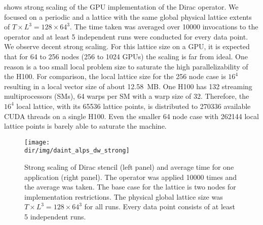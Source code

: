  shows strong scaling of the GPU implementation of the Dirac operator.
We focused on a periodic and a \Cstar lattice with the same global physical lattice extents of $T \times L^{3} = 128 \times 64^{3}$.
The time taken was averaged over \num{10000} invocations to the operator and at least \num{5} independent runs were conducted for every data point.
We observe decent strong scaling.
For this lattice size on a GPU, it is expected that for \num{64} to \num{256} nodes (\num{256} to \num{1024} GPUs) the scaling is far from ideal.
One reason is a too small local problem size to saturate the high parallelizability of the H100.
For comparison, the local lattice size for the \num{256} node case is $16^{4}$ resulting in a local vector size of about \SI{12.58}{MB}.
One H100 has \num{132} streaming multiprocessors (SMs), \num{64} warps per SM with a warp size of \num{32}.
Therefore, the $16^{4}$ local lattice, with its \num{65536} lattice points, is distributed to \num{270336} available CUDA threads on a single H100.
Even the smaller \num{64} node case with \num{262144} local lattice points is barely able to saturate the machine.
\begin{figure}
    \centering
    \texttt{[image: \\dir/img/daint\_alps\_dw\_strong]}
    \caption{Strong scaling of Dirac stencil (left panel) and average time for one application (right panel). The operator was applied \num{10000} times and the average was taken. The base case for the \Cstar lattice is two nodes for implementation restrictions. The physical global lattice size was $T \times L^{3} = 128 \times 64^{3}$ for all runs. Every data point consists of at least \num{5} independent runs. }
    \label{fig:daint:alps:dw:strong}
\end{figure}

